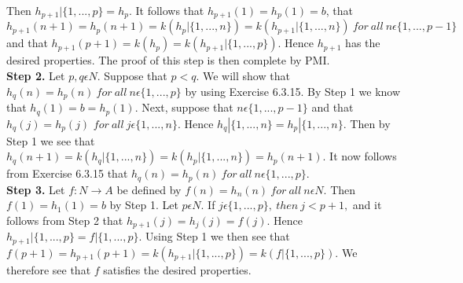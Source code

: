 \documentclass[a4paper,english,12pt]{article}
\begin{document}
Then $h_{p+1} |\{1,...,p\} = h_p$. It follows that $h_{p+1}(1) = h_p(1)=b$, that $h_{p+1}(n + 1) = h_p(n+1) = k(h_p |\{1,...,n\})=k(h_{p+1} |\{1,...,n\})~ for~ all~ n\epsilon \{1,. . ., p − 1\}$ and that $h_{p+1}(p +1) = k(h_p) = k(h_{p+1} |\{1,...,p\})$. Hence $h_{p+1}$ has the desired properties. The proof of this step is then complete by PMI.
\\
{\bf Step 2.} Let $p,q\epsilon N$. Suppose that $p<q$. We will show that $h_q(n) = h_p(n)~ for~ all~n\epsilon \{1, . . ., p\}$ by using Exercise 6.3.15. By Step 1 we know that $h_q(1) = b = h_p(1).$ Next, suppose that $n\epsilon \{1, . . ., p − 1\}$ and that $h_q(j)=h_p(j)$ $for~ all~j\epsilon \{1, . . ., n\}.$ Hence $h_q|\{1,...,n\} = h_p |\{1,...,n\}$. Then by Step 1 we see that $h_q(n+1)=k(h_q |\{1,...,n\})=k(h_p |\{1,...,n\})=h_p(n+1)$. It now follows from Exercise 6.3.15 that $h_q(n)=h_p(n)~for~all~n\epsilon \{1, . . ., p\}.$\\
{\bf Step 3.} Let $f:N\rightarrow A$ be defined by $f(n) = h_n(n)~ for~ all~ n\epsilon N$. Then $f(1)=h_1(1)=b$ by Step 1. Let $p\epsilon N$. If $j\epsilon \{1, . . ., p\}, ~then~ j < p + 1,$ and it follows from Step 2 that $h_{p+1}(j)=h_j(j)=f(j)$. Hence $h_{p+1}|\{1,...,p\}=f|\{1,...,p\}$. Using Step 1 we then see that $f(p + 1) = h_{p+1}(p + 1) = k(h_{p+1} |\{1,...,p\})=k(f|\{1,...,p\})$. We therefore see that $f$ satisfies the desired properties.
\end{document}
